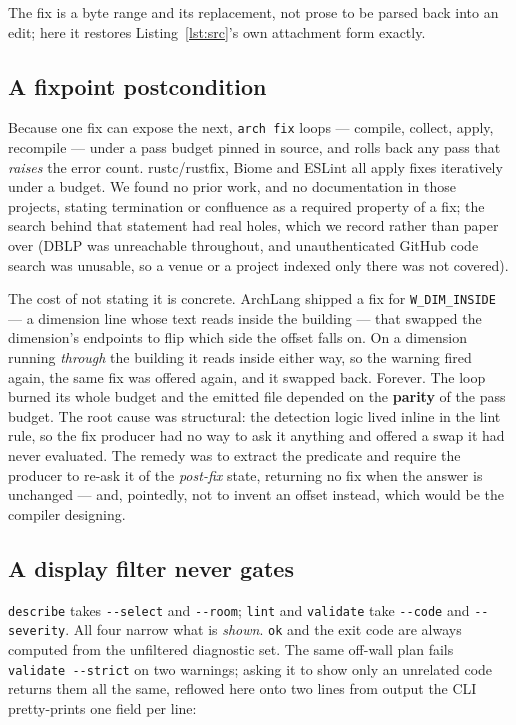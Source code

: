 \documentclass[10pt,conference]{IEEEtran}
\begin{document}
The fix is a byte range and its replacement, not prose to be parsed back into an edit;
here it restores Listing~\ref{lst:src}'s own attachment form exactly.

\subsection{A fixpoint postcondition}
Because one fix can expose the next, \texttt{arch fix} loops --- compile, collect,
apply, recompile --- under a pass budget pinned in source, and rolls back any pass that
\emph{raises} the error count. rustc/rustfix, Biome and ESLint all apply fixes
iteratively under a budget. We found no prior work, and no documentation in those
projects, stating termination or confluence as a required property of a fix; the
search behind that statement had real holes, which we record rather than paper over
(DBLP was unreachable throughout, and unauthenticated GitHub code search was unusable,
so a venue or a project indexed only there was not covered).

The cost of not stating it is concrete. ArchLang shipped a fix for
\texttt{W\_DIM\_INSIDE} --- a dimension line whose text reads inside the building ---
that swapped the dimension's endpoints to flip which side the offset falls on. On a
dimension running \emph{through} the building it reads inside either way, so the
warning fired again, the same fix was offered again, and it swapped back. Forever. The
loop burned its whole budget and the emitted file depended on the \textbf{parity} of
the pass budget. The root cause was structural: the detection logic lived inline in
the lint rule, so the fix producer had no way to ask it anything and offered a swap it
had never evaluated. The remedy was to extract the predicate and require the producer
to re-ask it of the \emph{post-fix} state, returning no fix when the answer is
unchanged --- and, pointedly, not to invent an offset instead, which would be the
compiler designing.

\subsection{A display filter never gates}
\texttt{describe} takes \texttt{-{}-select} and \texttt{-{}-room};
\texttt{lint} and \texttt{validate} take \texttt{-{}-code} and \texttt{-{}-severity}.
All four narrow what is \emph{shown}. \texttt{ok} and the exit code are always
computed from the unfiltered diagnostic set. The same off-wall plan fails
\texttt{validate -{}-strict} on two warnings; asking it to show only an unrelated code
returns them all the same, reflowed here onto two lines from output the CLI
pretty-prints one field per line:
\end{document}
